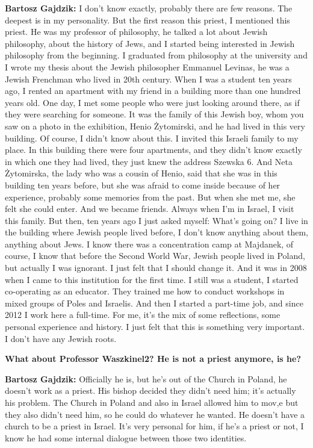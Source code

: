 \textbf{Bartosz Gajdzik:} I don’t know exactly, probably there are few reasons. The deepest is in my personality. But the first reason this priest, I mentioned this priest. He was my professor of philosophy, he talked a lot about Jewish philosophy, about the history of Jews, and I started being interested in Jewish philosophy from the beginning. I graduated from philosophy at the university and I wrote my thesis about the Jewish philosopher Emmanuel Levinas, he was a Jewish Frenchman who lived in 20th century. When I was a student ten years ago, I rented an apartment with my friend in a building more than one hundred years old. One day, I met some people who were just looking around there, as if they were searching for someone. It was the family of this Jewish boy, whom you saw on a photo in the exhibition, Henio Żytomirski, and he had lived in this very building. Of course, I didn’t know about this. I invited this Israeli family to my place. In this building there were four apartments, and they didn’t know exactly in which one they had lived, they just knew the address Szewska 6. And Neta Żytomirska, the lady who was a cousin of Henio, said that she was in this building ten years before, but she was afraid to come inside because of her experience, probably some memories from the past. But when she met me, she felt she could enter. And we became friends. Always when I’m in Israel, I visit this family. But then, ten years ago I just asked myself: What’s going on? I live in the building where Jewish people lived before, I don’t know anything about them, anything about Jews. I know there was a concentration camp at Majdanek, of course, I know that before the Second World War, Jewish people lived in Poland, but actually I was ignorant. I just felt that I should change it. And it was in 2008 when I came to this institution for the first time. I still was a student, I started co-operating as an educator. They trained me how to conduct workshops in mixed groups of Poles and Israelis. And then I started a part-time job, and since 2012 I work here a full-time. For me, it’s the mix of some reflections, some personal experience and history. I just felt that this is something very important. I don’t have any Jewish roots. 

\textbf{What about Professor Waszkinel2? He is not a priest anymore, is he?} 

\textbf{Bartosz Gajdzik:} Officially he is, but he’s out of the Church in Poland, he doesn’t work as a priest. His bishop decided they didn’t need him; it’s actually his problem. The Church in Poland and also in Israel allowed him to mov,e but they also didn’t need him, so he could do whatever he wanted. He doesn’t have a church to be a priest in Israel. It’s very personal for him, if he’s a priest or not, I know he had some internal dialogue between those two identities.  

